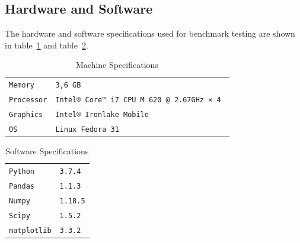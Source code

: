 \documentclass[sigconf, nonacm, natbib, screen, balance=False]{acmart}
\begin{document}
\subsection{Hardware and Software}\label{sec:specs}
The hardware and software specifications used for benchmark testing are shown in table~\ref{tbl:hard} and table~\ref{tbl:soft}.

\begin{table}
  \caption{Machine Specifications}
  \label{tbl:hard}
  \begin{tabular}{ll}
    \hline
    \verb!Memory! & \verb!3,6 GB! \\
    \verb!Processor! & \verb!Intel® Core™ i7 CPU M 620 @ 2.67GHz × 4 ! \\
    \verb!Graphics! & \verb!Intel® Ironlake Mobile! \\
    \verb!OS! & \verb!Linux Fedora 31! \\\hline
  \end{tabular}
\end{table}

\begin{table}
  \caption{Software Specifications}
  \label{tbl:soft}
  \begin{tabular}{ll}
    \hline
    \verb!Python! & \verb!3.7.4! \\
    \verb!Pandas! & \verb!1.1.3! \\
    \verb!Numpy! & \verb!1.18.5! \\
    \verb!Scipy! & \verb!1.5.2! \\
    \verb!matplotlib! & \verb!3.3.2! \\\hline
  \end{tabular}
\end{table}
\end{document}
